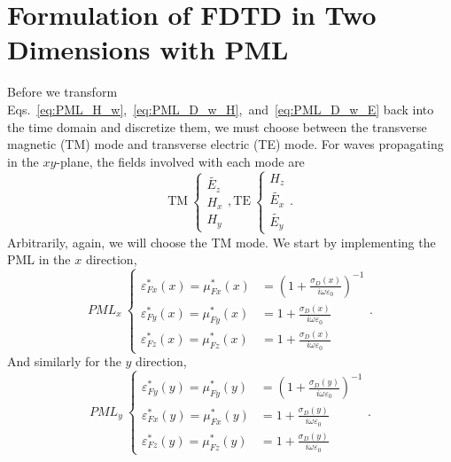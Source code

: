 \documentclass[12pt,twocolumn]{article}
\begin{document}
\section{Formulation of FDTD in Two Dimensions with PML}
Before we transform Eqs.~\ref{eq:PML_H_w},~\ref{eq:PML_D_w_H},~and~\ref{eq:PML_D_w_E} back into the time domain and discretize them, we must choose between the transverse magnetic (TM) mode and transverse electric (TE) mode. For waves propagating in the $xy$-plane, the fields involved with each mode are
\begin{subequations}
\begin{equation}
\mathrm{TM}~\left\{\begin{split}
\tilde{E_z}\\
H_x\\
H_y
\end{split}\right.,
\end{equation}
\begin{equation}
\mathrm{TE}~\left\{\begin{split}
H_z\\
\tilde{E_x}\\
\tilde{E_y}
\end{split}\right..
\end{equation}
\end{subequations}
Arbitrarily, again, we will choose the TM mode. We start by implementing the PML in the $x$ direction,
\begin{subequations}
\begin{equation}
\textit{PML}_x~\left\{\begin{split}
\varepsilon_{Fx}^*(x)=\mu_{Fx}^*(x)&=\left(1+\frac{\sigma_D(x)}{i\omega\varepsilon_0}\right)^{-1}\\
\varepsilon_{Fy}^*(x)=\mu_{Fy}^*(x)&=1+\frac{\sigma_D(x)}{i\omega\varepsilon_0}\\
\varepsilon_{Fz}^*(x)=\mu_{Fz}^*(x)&=1+\frac{\sigma_D(x)}{i\omega\varepsilon_0}
\end{split}\right..
\end{equation}
\end{subequations}
And similarly for the $y$ direction,
\begin{subequations}
\begin{equation}
\textit{PML}_y~\left\{\begin{split}
\varepsilon_{Fy}^*(y)=\mu_{Fy}^*(y)&=\left(1+\frac{\sigma_D(y)}{i\omega\varepsilon_0}\right)^{-1}\\
\varepsilon_{Fx}^*(y)=\mu_{Fx}^*(y)&=1+\frac{\sigma_D(y)}{i\omega\varepsilon_0}\\
\varepsilon_{Fz}^*(y)=\mu_{Fz}^*(y)&=1+\frac{\sigma_D(y)}{i\omega\varepsilon_0}
\end{split}\right..
\end{equation}
\end{subequations}
\end{document}
